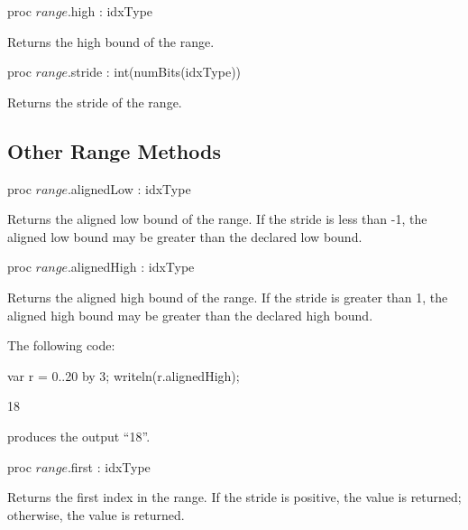 \begin{protohead}
proc $range$.high : idxType
\end{protohead}
\begin{protobody}
Returns the high bound of the range.
\end{protobody}

\begin{protohead}
proc $range$.stride : int(numBits(idxType))
\end{protohead}
\begin{protobody}
Returns the stride of the range.
\end{protobody}

\subsection{Other Range Methods}

\begin{protohead}
proc $range$.alignedLow : idxType
\end{protohead}
\begin{protobody}
Returns the aligned low bound of the range.  If the stride is less than -1, the
aligned low bound may be greater than the declared low bound.
\end{protobody}

\begin{protohead}
proc $range$.alignedHigh : idxType
\end{protohead}
\begin{protobody}
Returns the aligned high bound of the range.  If the stride is greater than 1,
the aligned high bound may be greater than the declared high bound.
\end{protobody}
\begin{example}
The following code:
\begin{chapelpre}
\end{chapelpre}
\begin{chapel}
var r = 0..20 by 3;
writeln(r.alignedHigh);
\end{chapel}
\begin{chapeloutput}
18
\end{chapeloutput}
produces the output ``18''.
\end{example}

\begin{protohead}
proc $range$.first : idxType
\end{protohead}
\begin{protobody}
Returns the first index in the range.  If the stride is positive, the 
 value is returned; otherwise, the  value is returned.
\end{protobody}

